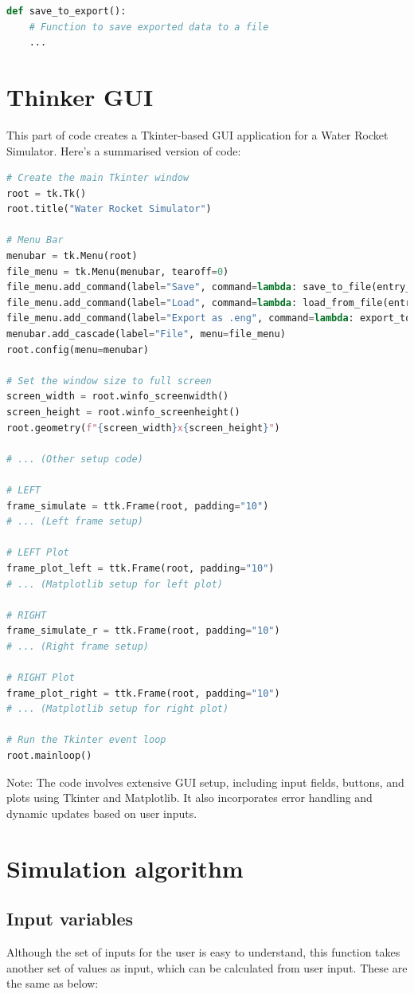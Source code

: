 \documentclass{report}
\begin{document}
\begin{lstlisting}[language=Python]
def save_to_export():
    # Function to save exported data to a file
    ...
\end{lstlisting}

\chapter{Thinker GUI}
This part of code creates a Tkinter-based GUI application for a Water Rocket Simulator. Here's a summarised version of code:

\begin{lstlisting}[language=Python]
# Create the main Tkinter window
root = tk.Tk()
root.title("Water Rocket Simulator")

# Menu Bar
menubar = tk.Menu(root)
file_menu = tk.Menu(menubar, tearoff=0)
file_menu.add_command(label="Save", command=lambda: save_to_file(entry_0))
file_menu.add_command(label="Load", command=lambda: load_from_file(entry_0))
file_menu.add_command(label="Export as .eng", command=lambda: export_to_file())
menubar.add_cascade(label="File", menu=file_menu)
root.config(menu=menubar)

# Set the window size to full screen
screen_width = root.winfo_screenwidth()
screen_height = root.winfo_screenheight()
root.geometry(f"{screen_width}x{screen_height}")

# ... (Other setup code)

# LEFT
frame_simulate = ttk.Frame(root, padding="10")
# ... (Left frame setup)

# LEFT Plot
frame_plot_left = ttk.Frame(root, padding="10")
# ... (Matplotlib setup for left plot)

# RIGHT
frame_simulate_r = ttk.Frame(root, padding="10")
# ... (Right frame setup)

# RIGHT Plot
frame_plot_right = ttk.Frame(root, padding="10")
# ... (Matplotlib setup for right plot)

# Run the Tkinter event loop
root.mainloop()
\end{lstlisting}

Note: The code involves extensive GUI setup, including input fields, buttons, and plots using Tkinter and Matplotlib. It also incorporates error handling and dynamic updates based on user inputs.

\chapter{Simulation algorithm}
\section{Input variables}
Although the set of inputs for the user is easy to understand, this function takes another set of values as input, which can be calculated from user input. These are the same as below:
\end{document}
